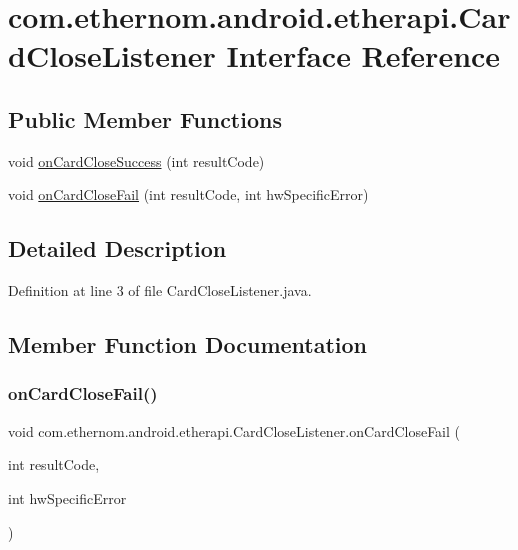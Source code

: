 \hypertarget{interfacecom_1_1ethernom_1_1android_1_1etherapi_1_1_card_close_listener}{}\section{com.\+ethernom.\+android.\+etherapi.\+Card\+Close\+Listener Interface Reference}
\label{interfacecom_1_1ethernom_1_1android_1_1etherapi_1_1_card_close_listener}
\subsection*{Public Member Functions}
\begin{DoxyCompactItemize}
\item 
void \mbox{\hyperlink{interfacecom_1_1ethernom_1_1android_1_1etherapi_1_1_card_close_listener_a6fff42211bd62d755d223e49e509ec63}{on\+Card\+Close\+Success}} (int result\+Code)
\item 
void \mbox{\hyperlink{interfacecom_1_1ethernom_1_1android_1_1etherapi_1_1_card_close_listener_a3daa3ea800ea1ebb46347376f079e765}{on\+Card\+Close\+Fail}} (int result\+Code, int hw\+Specific\+Error)
\end{DoxyCompactItemize}


\subsection{Detailed Description}


Definition at line 3 of file Card\+Close\+Listener.\+java.



\subsection{Member Function Documentation}
\mbox{\label{interfacecom_1_1ethernom_1_1android_1_1etherapi_1_1_card_close_listener_a3daa3ea800ea1ebb46347376f079e765}} 
\subsubsection{\texorpdfstring{on\+Card\+Close\+Fail()}{onCardCloseFail()}}
{\footnotesize\ttfamily void com.\+ethernom.\+android.\+etherapi.\+Card\+Close\+Listener.\+on\+Card\+Close\+Fail (\begin{DoxyParamCaption}\item[{int}]{result\+Code,  }\item[{int}]{hw\+Specific\+Error }\end{DoxyParamCaption})}


